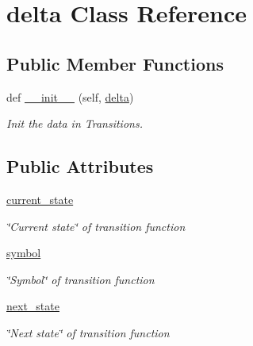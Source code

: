 \hypertarget{classfinite__automaton_1_1delta}{}\section{delta Class Reference}
\label{classfinite__automaton_1_1delta}
\subsection*{Public Member Functions}
\begin{DoxyCompactItemize}
\item 
def \mbox{\hyperlink{classfinite__automaton_1_1delta_ad6a72e806e6cfa1854686b4830777ced}{\+\_\+\+\_\+init\+\_\+\+\_\+}} (self, \mbox{\hyperlink{classfinite__automaton_1_1delta}{delta}})
\begin{DoxyCompactList}\small\item\em Init the data in Transitions. \end{DoxyCompactList}\end{DoxyCompactItemize}
\subsection*{Public Attributes}
\begin{DoxyCompactItemize}
\item 
\mbox{\label{classfinite__automaton_1_1delta_acc53c2cac20bdbeee95a9059618d7c25}} 
\mbox{\hyperlink{classfinite__automaton_1_1delta_acc53c2cac20bdbeee95a9059618d7c25}{current\+\_\+state}}
\begin{DoxyCompactList}\small\item\em \char`\"{}\+Current state\char`\"{} of transition function \end{DoxyCompactList}\item 
\mbox{\label{classfinite__automaton_1_1delta_ad6429bcea17de482deac7f5460ec4e89}} 
\mbox{\hyperlink{classfinite__automaton_1_1delta_ad6429bcea17de482deac7f5460ec4e89}{symbol}}
\begin{DoxyCompactList}\small\item\em \char`\"{}\+Symbol\char`\"{} of transition function \end{DoxyCompactList}\item 
\mbox{\label{classfinite__automaton_1_1delta_a677bf607ba7e177c026a1c8eb292d293}} 
\mbox{\hyperlink{classfinite__automaton_1_1delta_a677bf607ba7e177c026a1c8eb292d293}{next\+\_\+state}}
\begin{DoxyCompactList}\small\item\em \char`\"{}\+Next state\char`\"{} of transition function \end{DoxyCompactList}\end{DoxyCompactItemize}



